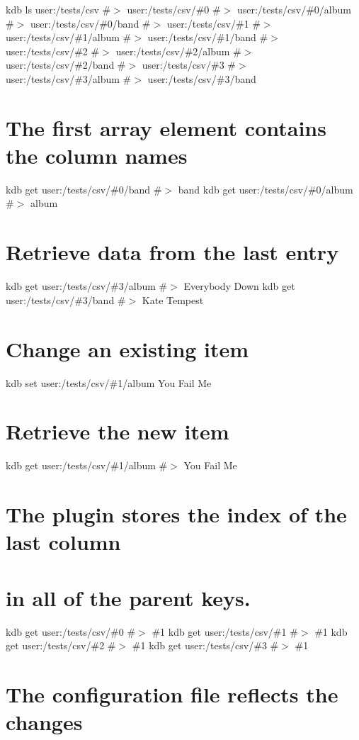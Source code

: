 kdb ls user\+:/tests/csv \#$>$ user\+:/tests/csv/\#0 \#$>$ user\+:/tests/csv/\#0/album \#$>$ user\+:/tests/csv/\#0/band \#$>$ user\+:/tests/csv/\#1 \#$>$ user\+:/tests/csv/\#1/album \#$>$ user\+:/tests/csv/\#1/band \#$>$ user\+:/tests/csv/\#2 \#$>$ user\+:/tests/csv/\#2/album \#$>$ user\+:/tests/csv/\#2/band \#$>$ user\+:/tests/csv/\#3 \#$>$ user\+:/tests/csv/\#3/album \#$>$ user\+:/tests/csv/\#3/band\hypertarget{autotoc_md123_autotoc_md131}{}\section{The first array element contains the column names}\label{autotoc_md123_autotoc_md131}
kdb get user\+:/tests/csv/\#0/band \#$>$ band kdb get user\+:/tests/csv/\#0/album \#$>$ album\hypertarget{autotoc_md123_autotoc_md132}{}\section{Retrieve data from the last entry}\label{autotoc_md123_autotoc_md132}
kdb get user\+:/tests/csv/\#3/album \#$>$ Everybody Down kdb get user\+:/tests/csv/\#3/band \#$>$ Kate Tempest\hypertarget{autotoc_md123_autotoc_md133}{}\section{Change an existing item}\label{autotoc_md123_autotoc_md133}
kdb set user\+:/tests/csv/\#1/album \textquotesingle{}You Fail Me\textquotesingle{} \hypertarget{autotoc_md123_autotoc_md134}{}\section{Retrieve the new item}\label{autotoc_md123_autotoc_md134}
kdb get user\+:/tests/csv/\#1/album \#$>$ You Fail Me\hypertarget{autotoc_md123_autotoc_md135}{}\section{The plugin stores the index of the last column}\label{autotoc_md123_autotoc_md135}
\hypertarget{autotoc_md123_autotoc_md136}{}\section{in all of the parent keys.}\label{autotoc_md123_autotoc_md136}
kdb get user\+:/tests/csv/\#0 \#$>$ \#1 kdb get user\+:/tests/csv/\#1 \#$>$ \#1 kdb get user\+:/tests/csv/\#2 \#$>$ \#1 kdb get user\+:/tests/csv/\#3 \#$>$ \#1\hypertarget{autotoc_md123_autotoc_md137}{}\section{The configuration file reflects the changes}\label{autotoc_md123_autotoc_md137}
